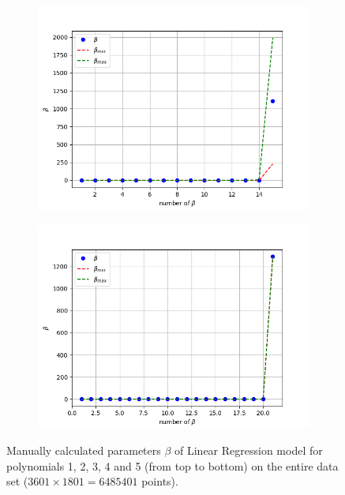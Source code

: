 \begin{figure}[!ht]
\begin{subfigure}{\textwidth}
\end{subfigure}
\begin{subfigure}{\textwidth}
  \centering
\includegraphics[width=0.5\linewidth]{images/real/real_ridge_beta_p04_nreal.png}
\end{subfigure}
\begin{subfigure}{\textwidth}
  \centering
\includegraphics[width=0.5\linewidth]{images/real/real_linear_beta_p05_nreal.png}
\end{subfigure}
\caption{Manually calculated parameters $\beta$ of Linear Regression model for polynomials 1, 2, 3, 4 and 5 (from top to bottom) on the entire data set ($3601\times1801 = 6485401$ points).}
\label{fig:linear-beta-real}
\end{figure}

